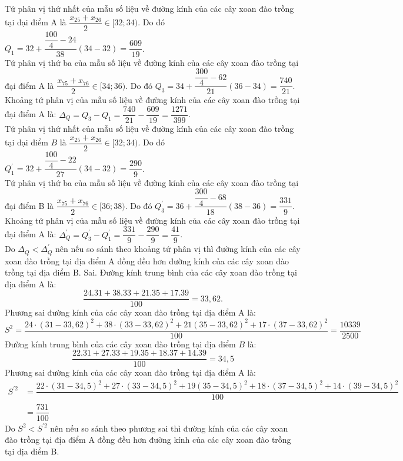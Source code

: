 \begin{ex}
{\begin{itemchoice}
			Tứ phân vị thứ nhất của mẫu số liệu về đường kính của các cây xoan đào trồng tại đại điểm A là $\dfrac{{x}_{25}+{x}_{26}}{2} \in[32 ; 34)$. Do đó ${Q}_{1}=32+\dfrac{\dfrac{100}{4}-24}{38}(34-32)=\dfrac{609}{19}$. \\
			Tứ phân vị thứ ba của mẫu số liệu về đường kính của các cây xoan đào trồng tại đại điểm A là $\dfrac{{x}_{75}+{x}_{76}}{2} \in[34 ; 36)$. Do đó ${Q}_{3}=34+\dfrac{\dfrac{300}{4}-62}{21}(36-34)=\dfrac{740}{21}$. \\
			Khoảng tứ phân vị của mẫu số liệu về đường kính của các cây xoan đào trồng tại đại điểm A là:
			$\Delta_{Q}=Q_{3}-Q_{1}=\dfrac{740}{21}-\dfrac{609}{19}=\dfrac{1271}{399}$.\\
			Tứ phân vị thứ nhất của mẫu số liệu về đường kính của các cây xoan đào trồng tại đại điểm $B$ là $\dfrac{{x}_{25}+{x}_{26}}{2} \in[32 ; 34)$. Do đó ${Q}_{1}^{\prime}=32+\dfrac{\dfrac{100}{4}-22}{27}(34-32)=\dfrac{290}{9}$. \\
			Tứ phân vị thứ ba của mẫu số liệu về đường kính của các cây xoan đào trồng tại đại điểm B là $\dfrac{{x}_{75}+{x}_{76}}{2} \in[36 ; 38)$. Do đó ${Q}_{3}^{\prime}=36+\dfrac{\dfrac{300}{4}-68}{18}(38-36)=\dfrac{331}{9}$.\\
			Khoảng tứ phân vị của mẫu số liệu về đường kính của các cây xoan đào trồng tại đại điểm A là: $\Delta_{Q}^{\prime}={Q}_{3}^{\prime}-{Q}_{1}^{\prime}=\dfrac{331}{9}-\dfrac{290}{9}=\dfrac{41}{9}$.\\
			Do $\Delta_{Q}<\Delta_{Q}^{\prime}$ nên nếu so sánh theo khoảng tứ phân vị thì đường kính của các cây xoan đào trồng tại địa điểm A đồng đều hơn đường kính của các cây xoan đào trồng tại địa điểm B.
			\itemch Sai. Đường kính trung bình của các cây xoan đào trồng tại địa điểm A là:
			$$
			\dfrac{24.31+38.33+21.35+17.39}{100}=33,62 .
			$$
			Phương sai đường kính của các cây xoan đào trồng tại địa điểm A là:
			$$
			S^{2}=\dfrac{24 \cdot(31-33,62)^{2}+38 \cdot(33-33,62)^{2}+21(35-33,62)^{2}+17 \cdot(37-33,62)^{2}}{100}=\dfrac{10339}{2500}
			$$
			Đường kính trung bình của các cây xoan đào trồng tại địa điểm $B$ là:
			$$
			\dfrac{22.31+27.33+19.35+18.37+14.39}{100}=34,5
			$$
			Phương sai đường kính của các cây xoan đào trồng tại địa điểm A là:
			\begin{align*}
				S^{\prime 2}&=\dfrac{22 \cdot(31-34,5)^{2}+27 \cdot(33-34,5)^{2}+19(35-34,5)^{2}+18 \cdot(37-34,5)^{2}+14 \cdot(39-34,5)^{2}}{100}\\
				&=\dfrac{731}{100}
			\end{align*}
			Do $S^{2}<{S}^{\prime 2}$ nên nếu so sánh theo phương sai thì đường kính của các cây xoan đào trồng tại địa điểm A đồng đều hơn đường kính của các cây xoan đào trồng tại địa điểm B.

\end{itemchoice}}
\end{ex}
